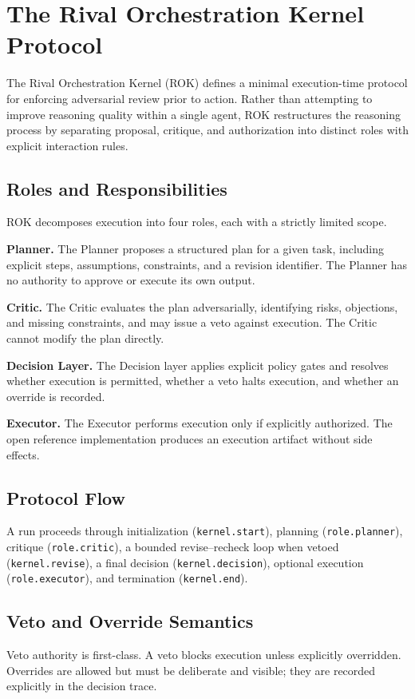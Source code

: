 \section{The Rival Orchestration Kernel Protocol}

The Rival Orchestration Kernel (ROK) defines a minimal execution-time protocol for enforcing adversarial review prior to action. Rather than attempting to improve reasoning quality within a single agent, ROK restructures the reasoning process by separating proposal, critique, and authorization into distinct roles with explicit interaction rules.

\subsection{Roles and Responsibilities}
ROK decomposes execution into four roles, each with a strictly limited scope.

\textbf{Planner.} The Planner proposes a structured plan for a given task, including explicit steps, assumptions, constraints, and a revision identifier. The Planner has no authority to approve or execute its own output.

\textbf{Critic.} The Critic evaluates the plan adversarially, identifying risks, objections, and missing constraints, and may issue a veto against execution. The Critic cannot modify the plan directly.

\textbf{Decision Layer.} The Decision layer applies explicit policy gates and resolves whether execution is permitted, whether a veto halts execution, and whether an override is recorded.

\textbf{Executor.} The Executor performs execution only if explicitly authorized. The open reference implementation produces an execution artifact without side effects.

\subsection{Protocol Flow}
A run proceeds through initialization (\texttt{kernel.start}), planning (\texttt{role.planner}), critique (\texttt{role.critic}), a bounded revise–recheck loop when vetoed (\texttt{kernel.revise}), a final decision (\texttt{kernel.decision}), optional execution (\texttt{role.executor}), and termination (\texttt{kernel.end}).

\subsection{Veto and Override Semantics}
Veto authority is first-class. A veto blocks execution unless explicitly overridden. Overrides are allowed but must be deliberate and visible; they are recorded explicitly in the decision trace.

